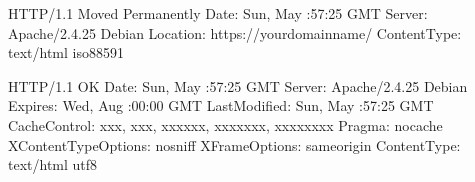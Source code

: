 \documentclass[a4paper,10pt,english,openany,oneside]{sphinxmanual}
\begin{document}
\begin{sphinxVerbatim}[commandchars=\\\{\},numbers=left,firstnumber=1,stepnumber=1]
HTTP/1.1  Moved Permanently
Date: Sun,  May  :57:25 GMT
Server: Apache/2.4.25 Debian
Location: https://your\PYGZhy{}domain\PYGZhy{}name/
Content\PYGZhy{}Type: text/html iso\PYGZhy{}8859\PYGZhy{}1

HTTP/1.1  OK
Date: Sun,  May  :57:25 GMT
Server: Apache/2.4.25 Debian
Expires: Wed,  Aug  :00:00 GMT
Last\PYGZhy{}Modified: Sun,  May  :57:25 GMT
Cache\PYGZhy{}Control: xxx, xxx, xxx\PYGZhy{}xxx, xxxxxxx, xxxxxxxx
Pragma: no\PYGZhy{}cache
X\PYGZhy{}Content\PYGZhy{}Type\PYGZhy{}Options: nosniff
X\PYGZhy{}Frame\PYGZhy{}Options: sameorigin
Content\PYGZhy{}Type: text/html utf\PYGZhy{}8
\end{sphinxVerbatim}
\end{document}
